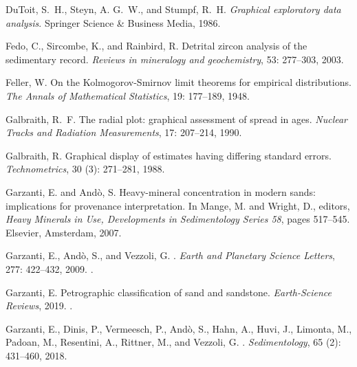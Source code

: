 \documentclass[11pt]{article}
\begin{document}
\begin{thebibliography}{68}
DuToit, S.~H., Steyn, A. G.~W., and Stumpf, R.~H.
\newblock \emph{Graphical exploratory data analysis}.
\newblock Springer Science \& Business Media, 1986.

Fedo, C., Sircombe, K., and Rainbird, R.
\newblock Detrital zircon analysis of the sedimentary record.
\newblock \emph{Reviews in mineralogy and geochemistry}, 53: 277--303,
  2003.

Feller, W.
\newblock On the {K}olmogorov-{S}mirnov limit theorems for empirical
  distributions.
\newblock \emph{The Annals of Mathematical Statistics}, 19: 177--189,
  1948.

Galbraith, R.~F.
\newblock The radial plot: graphical assessment of spread in ages.
\newblock \emph{Nuclear Tracks and Radiation Measurements}, 17:
  207--214, 1990.

Galbraith, R.
\newblock Graphical display of estimates having differing standard errors.
\newblock \emph{Technometrics}, 30 (3): 271--281, 1988.

Garzanti, E. and And{\`{o}}, S.
\newblock Heavy-mineral concentration in modern sands: implications for
  provenance interpretation.
\newblock In Mange, M. and Wright, D., editors, \emph{Heavy Minerals in Use,
  {D}evelopments in {S}edimentology {S}eries 58}, pages 517--545. Elsevier,
  Amsterdam, 2007.

{Garzanti}, E., {And{\`o}}, S., and {Vezzoli}, G.
.
\newblock \emph{Earth and Planetary Science Letters}, 277: 422--432,
  2009.
\newblock {}.

Garzanti, E.
\newblock Petrographic classification of sand and sandstone.
\newblock \emph{Earth-Science Reviews}, 2019.
\newblock {}.

Garzanti, E., Dinis, P., Vermeesch, P., And{\`o}, S., Hahn, A., Huvi, J.,
  Limonta, M., Padoan, M., Resentini, A., Rittner, M., and Vezzoli, G.
.
\newblock \emph{Sedimentology}, 65 (2): 431--460, 2018.


\end{thebibliography}
\end{document}
